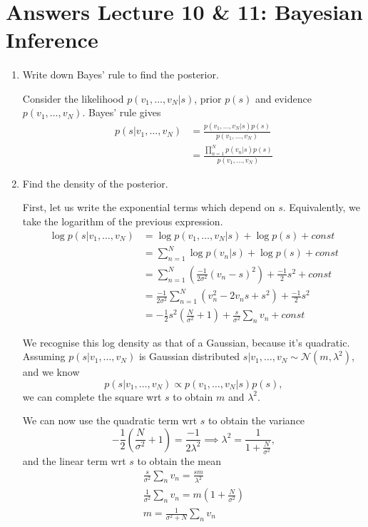 \section{Answers Lecture 10 \& 11: Bayesian Inference}

\paragraph{} 

\begin{enumerate}[label=\alph*.]
\item Write down Bayes' rule to find the posterior.

Consider the likelihood $p(v_1, \dots, v_N | s)$, prior $p(s)$ and evidence $p(v_1, \dots, v_N)$. Bayes' rule gives
\begin{align}
p(s|v_1, \dots, v_N) &= \frac{p(v_1, \dots, v_N | s) p(s)}{p(v_1, \dots, v_N)} \\
&= \frac{\prod_{n=1}^N p(v_n|s) p(s)}{p(v_1, \dots, v_N)}
\end{align}

\item Find the density of the posterior.

First, let us write the exponential terms which depend on $s$. Equivalently, we take the logarithm of the previous expression.
\begin{align*}
\log p(s|v_1, \dots, v_N) &= \log p(v_1, \dots, v_N | s) + \log p(s) + const\\
&=\sum_{n=1}^N\log p(v_n|s) + \log p(s) + const\\
&=\sum_{n=1}^N \left(\frac{-1}{2\sigma^2}(v_n - s)^2\right) + \frac{-1}{2}s^2 + const\\
&= \frac{-1}{2\sigma^2}\sum_{n=1}^N \left(v_n^2 - 2v_n s + s^2\right) + \frac{-1}{2}s^2\\
&= -\frac{1}{2}s^2\left(\frac{N}{\sigma^2} + 1 \right) + \frac{s}{\sigma^2}\sum_{n}v_n + const
\end{align*}

We recognise this log density as that of a Gaussian, because it's quadratic. Assuming $p(s|v_1, \dots, v_N)$ is Gaussian distributed $s|v_1,\dots,v_N \sim \mathcal{N}(m, \lambda^2)$, and we know
\begin{equation}
p(s|v_1, \dots, v_N) \propto p(v_1, \dots, v_N | s) p(s),
\end{equation}
we can complete the square wrt $s$ to obtain $m$ and $\lambda^2$.

We can now use the quadratic term wrt $s$ to obtain the variance
\begin{equation}
-\frac{1}{2}\left(\frac{N}{\sigma^2} + 1 \right) = \frac{-1}{2\lambda^2} \implies \lambda^2 = \frac{1}{1 + \frac{N}{\sigma^2}},
\end{equation}
and the linear term wrt $s$ to obtain the mean
\begin{align*}
\frac{s}{\sigma^2}\sum_{n}v_n = \frac{sm}{\lambda^2}\\
\frac{1}{\sigma^2}\sum_{n}v_n= m\left(1 + \frac{N}{\sigma^2}\right)\\
m = \frac{1}{\sigma^2 + N}\sum_{n}v_n
\end{align*}


\end{enumerate}
